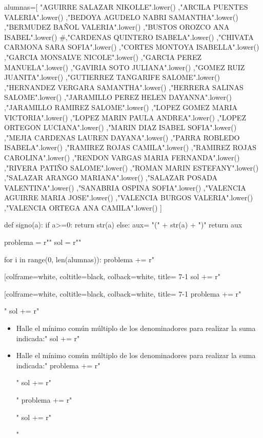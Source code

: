 \documentclass[openany]{scrartcl}
\begin{document}
\begin{sagesilent}
 
 
alumnas=[
  "AGUIRRE SALAZAR NIKOLLE".lower()   
,"ARCILA PUENTES VALERIA".lower()
,"BEDOYA AGUDELO NABRI SAMANTHA".lower()
,"BERMUDEZ BAÑOL VALERIA".lower()
,"BUSTOS OROZCO ANA ISABEL".lower() 
#,"CARDENAS QUINTERO ISABELA".lower() 
,"CHIVATA CARMONA SARA SOFIA".lower()
,"CORTES MONTOYA ISABELLA".lower() 
,"GARCIA MONSALVE NICOLE".lower() 
,"GARCIA PEREZ MANUELA".lower() 
,"GAVIRIA SOTO JULIANA".lower() 
,"GOMEZ RUIZ JUANITA".lower() 
,"GUTIERREZ TANGARIFE SALOME".lower() 
,"HERNANDEZ VERGARA SAMANTHA".lower() 
,"HERRERA SALINAS SALOME".lower() 
,"JARAMILLO PEREZ HELEN DAYANNA".lower()
,"JARAMILLO RAMIREZ SALOME".lower() 
,"LOPEZ GOMEZ MARIA VICTORIA".lower()
,"LOPEZ MARIN PAULA ANDREA".lower()
,"LOPEZ ORTEGON LUCIANA".lower() 
,"MARIN DIAZ ISABEL SOFIA".lower()
,"MEJIA CARDENAS LAUREN DAYANA".lower()
,"PARRA ROBLEDO ISABELA".lower() 
,"RAMIREZ ROJAS CAMILA".lower() 
,"RAMIREZ ROJAS CAROLINA".lower() 
,"RENDON VARGAS MARIA FERNANDA".lower()
,"RIVERA PATIÑO SALOME".lower() 
,"ROMAN MARIN ESTEFANY".lower() 
,"SALAZAR ARANGO MARIANA".lower() 
,"SALAZAR POSADA VALENTINA".lower() 
,"SANABRIA OSPINA SOFIA".lower() 
,"VALENCIA AGUIRRE MARIA JOSE".lower()
,"VALENCIA BURGOS VALERIA".lower() 
,"VALENCIA ORTEGA  ANA CAMILA".lower()
]

def signo(a):
   if a>=0:
      return str(a)
   else:
      aux= "(" + str(a) + ")"
      return aux   


problema =  r""
sol = r""

  
for i in range(0, len(alumnas)):
   problema += r"\begin{tcolorbox}[colframe=white, coltitle=black, colback=white, title= 7-1 %
   sol += r"\begin{tcolorbox}[colframe=white, coltitle=black, colback=white, title= 7-1 %
   problema += r"\begin{itemize}"
   sol += r"\begin{itemize}"
   problema += r"\item Halle el mínimo común múltiplo de los denominadores para realizar la suma indicada:"
   sol += r"\item Halle el mínimo común múltiplo de los denominadores para realizar la suma indicada:"
   problema += r"\begin{enumerate}"
   sol += r"\begin{enumerate}"
   problema += r"\begin{multicols}{2}"
   sol += r"\begin{multicols}{2}"
	   

\end{multicols}
\end{multicols}
\end{enumerate}
\end{enumerate}
\end{itemize}
\end{itemize}
\end{tcolorbox}
\end{tcolorbox}
\end{sagesilent}
\end{document}
